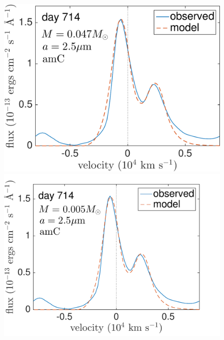\begin{figure}
\includegraphics[trim =-25 30 0 0,clip=true,scale=0.33]{chapters/chapter5/images/silicates_take2/OI/AmC_Dwek.pdf}
\hspace{3mm}
\includegraphics[trim =0 30 0 -25,clip=true,scale=0.33]{chapters/chapter5/images/silicates_take2/OI/AmC_bestfit.pdf}


\end{figure}
